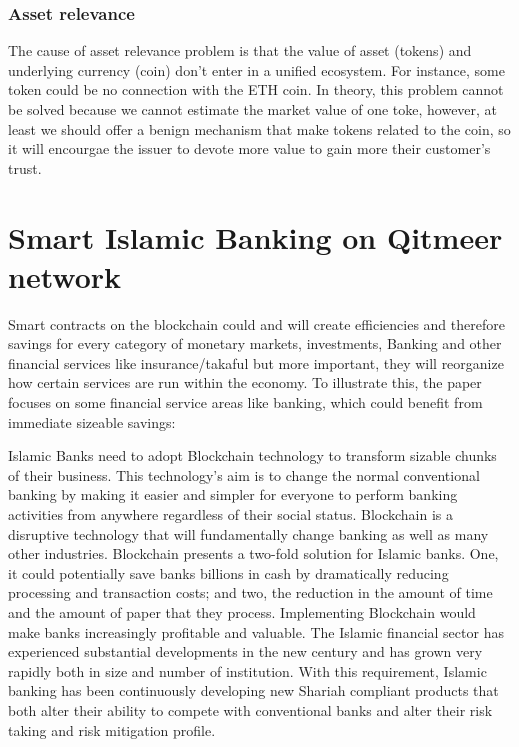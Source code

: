 \documentclass[a4paper,11pt]{article}
\begin{document}
\subsubsection{Asset relevance}
The cause of asset relevance problem is that the value of asset (tokens) and underlying currency (coin) don't  enter in a unified ecosystem. For instance, some token could be no connection with the ETH coin. In theory, this problem cannot be solved because we cannot estimate the market value of one toke, however, at least we should offer a benign mechanism that make tokens related to the coin, so it will encourgae the issuer to devote more value to gain more their customer's trust.



\section{Smart Islamic Banking on Qitmeer network}

Smart contracts on the blockchain could and will create efficiencies and therefore savings for every category of monetary markets, investments, Banking and other financial services like insurance/takaful but more important, they will reorganize how certain services are run within the economy. To illustrate this, the paper focuses on some financial service areas like banking, which could benefit from immediate sizeable savings:

Islamic Banks need to adopt Blockchain technology to transform sizable chunks of their business. This technology’s aim is to change the normal conventional banking by making it easier and simpler for everyone to perform banking activities from anywhere regardless of their social status. Blockchain is a disruptive technology that will fundamentally change banking as well as many other industries. Blockchain presents a two-fold solution for Islamic banks. One, it could potentially save banks billions in cash by dramatically reducing processing and transaction costs; and two, the reduction in the amount of time and the amount of paper that they process. Implementing Blockchain would make banks increasingly profitable and valuable.  The Islamic financial sector has experienced substantial developments in the new century and has grown very rapidly both in size and number of institution. With this requirement, Islamic banking has been continuously developing new Shariah compliant products that both alter their ability to compete with conventional banks and alter their risk taking and risk mitigation profile. 
\end{document}

